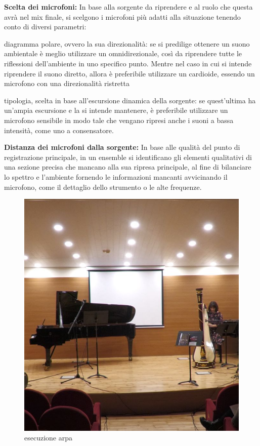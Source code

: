 	\begin{compactitem}
		\item \textbf{Scelta dei microfoni:} In base alla sorgente da riprendere e al ruolo che questa avrà nel mix finale, si scelgono i microfoni più adatti alla situazione tenendo conto di diversi parametri:
			\begin{compactitem}
				\item diagramma polare, ovvero la sua direzionalità: se si predilige ottenere un suono ambientale è meglio utilizzare un omnidirezionale, così da riprendere tutte le riflessioni dell'ambiente in uno specifico punto. Mentre nel caso in cui si intende riprendere il suono diretto, allora è preferibile utilizzare un cardioide, essendo un microfono con una direzionalità ristretta
				\item tipologia, scelta in base all'escursione dinamica della sorgente: se quest'ultima ha un'ampia escursione e la si intende mantenere, è preferibile utilizzare un microfono sensibile in modo tale che vengano ripresi anche i suoni a bassa intensità, come uno a consensatore.
			\end{compactitem}
		\item \textbf{Distanza dei microfoni dalla sorgente:} In base alle qualità del punto di registrazione principale, in un ensemble si identificano gli elementi qualitativi di una sezione precisa che mancano alla sua ripresa principale, al fine di bilanciare lo spettro e l'ambiente fornendo le informazioni mancanti avvicinando il microfono, come il dettaglio dello strumento o le alte frequenze.
	\end{compactitem}

	\begin{figure}[h]
		\begin{center}
			\includegraphics[width= .50\textwidth]{img/image3.jpg}
			\caption{esecuzione arpa}
		\end{center}
	\end{figure}
	
